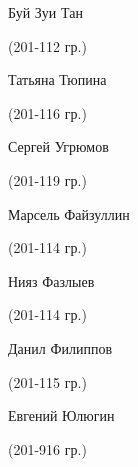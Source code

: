 \begin{multicols}{2}
\begin{small}
\begin{enumerate*}
	\item Буй Зуи Тан\begin{tiny} (201-112 гр.)\end{tiny}
	\item Татьяна Тюпина\begin{tiny} (201-116 гр.)\end{tiny}
	\item Сергей Угрюмов\begin{tiny} (201-119 гр.)\end{tiny}
	\item Марсель Файзуллин\begin{tiny} (201-114 гр.)\end{tiny}
	\item Нияз Фазлыев\begin{tiny} (201-114 гр.)\end{tiny}
	\item Данил Филиппов\begin{tiny} (201-115 гр.)\end{tiny}
	\item Евгений Юлюгин\begin{tiny} (201-916 гр.)\end{tiny}
\end{enumerate*}
\end{small}
\end{multicols}
